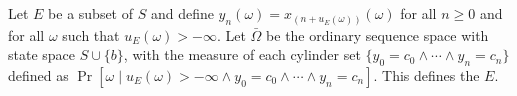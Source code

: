 Let $E$ be a subset of $S$ and define $y_n(\omega) = x_{(n+u_E(\omega))}(\omega)$ for all $n \geq 0$ and for all $\omega$ such that $u_E(\omega) > -\infty$. Let $\bar{\Omega}$ be the ordinary sequence space with state space $S \cup \{b\}$, with the measure of each cylinder set $\{y_0 = c_0 \land \cdots \land y_n = c_n\}$ defined as $\Pr[\omega \mid u_E(\omega) > -\infty \land y_0 = c_0 \land \cdots \land y_n = c_n]$. This defines the  $E$.
